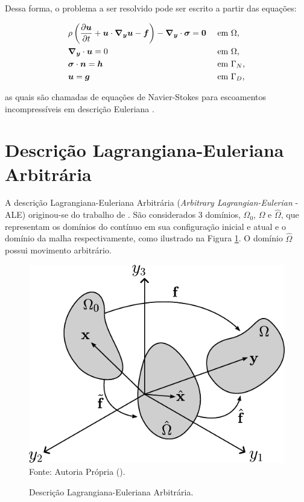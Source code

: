 Dessa forma, o problema a ser resolvido pode ser escrito a partir das equações:

\begin{subequations}
    \begin{align}
         & \rho\left({\frac{\partial{\boldsymbol{u}}}{\partial t}+\boldsymbol{u}\cdot\boldsymbol{\nabla_y}\boldsymbol{u}-\boldsymbol{f}}\right)-\boldsymbol{\nabla_y}\cdot\boldsymbol{\sigma}=\boldsymbol{0} &  & \text{ em }\Omega\text{,}   \\
         & \boldsymbol{\nabla_y}\cdot\boldsymbol{u}=0                                                           &  & \text{ em }\Omega\text{,}   \\
         & \boldsymbol{\sigma}\cdot\boldsymbol{n}=\boldsymbol{h}                                                    &  & \text{ em }\Gamma_N\text{,} \\
         & \boldsymbol{u}=\boldsymbol{g}                                                              &  & \text{ em }\Gamma_D\text{,}
    \end{align}
    \label{eq:NS-Euler}
\end{subequations}

\noindent as quais são chamadas de equações de Navier-Stokes para escoamentos incompressíveis em descrição Euleriana \cite{bazilevs2013computational,bazilevs2010large,bazilevs2007variational,hughes2002variational,hughes2000large}.

\section{Descrição Lagrangiana-Euleriana Arbitrária} \label{CFD-ALE}

A descrição Lagrangiana-Euleriana Arbitrária (\textit{Arbitrary Lagrangian-Eulerian} - ALE) originou-se do trabalho de . São considerados 3 domínios, $\Omega_0$, $\Omega$ e $\hat{\Omega}$, que representam os domínios do contínuo em sua configuração inicial e atual e o domínio da malha respectivamente, como ilustrado na Figura \ref{Fig:ALE}. O domínio $\hat{\Omega}$ possui movimento arbitrário.

\begin{figure}[h!]
    \centering
    \caption{Descrição Lagrangiana-Euleriana Arbitrária.}
    \includegraphics[width=.45\linewidth]{Figuras/ALE.pdf}
    \label{Fig:ALE}
    \\Fonte: Autoria Própria (\the\year).
\end{figure}

